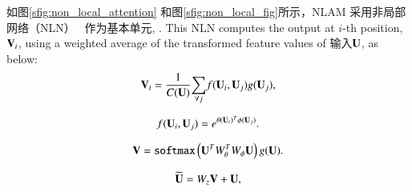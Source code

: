 \documentclass[macfonts,phd,oneside,nobackinfo]{njuthesis}
\begin{document}
如图\ref{sfig:non_local_attention} 和图\ref{sfig:non_local_fig}所示，NLAM 采用非局部网络（NLN）~\cite{wang2018non} 作为基本单元, . This NLN computes the output at $i$-th position, ${\bf V}_i$, using a weighted average of the transformed feature values of 输入$\bf U$, as below:
\begin{equation}
{\bf V}_i = \frac{1}{C({\bf U})}{\sum_{{\forall}j}}f({\bf U}_i, {\bf U}_j)g({\bf U}_j),
\label{Eq1}
\end{equation}

\begin{equation}
f({\bf U}_i, {\bf U}_j) = e^{\theta({\bf U}_i)^T\phi({\bf U}_j)}.
\label{Eq2}
\end{equation}

\begin{equation}
{\bf V} = {\tt softmax}\left({\bf U}^TW_{\theta}^TW_{\phi}{\bf U}\right)g({\bf U}). \label{eq:nl_Y}
\end{equation}

\begin{equation}
{\bf \widetilde{U}} = W_{z}{\bf V}+ {\bf U}, \label{eq:nl_Z}
\end{equation}

\end{document}
